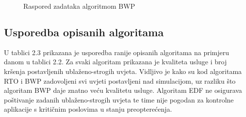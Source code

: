 \documentclass[../zavrsni.tex]{subfiles}
\begin{document}
 \begin{figure}[h!]
    \centering

    \begin{RTGrid}[width=13cm]{3}{24}

    
  
    
  
    

    \end{RTGrid}

    \caption{Raspored zadataka algoritmom BWP}
    \label{fig:ex1}
  \end{figure}

\subsection{Usporedba opisanih algoritama}

U tablici 2.3 prikazana je usporedba ranije opisanih algoritama na primjeru danom u tablici 2.2. Za svaki algoritam prikazana je 
kvaliteta usluge i broj kršenja postavljenih ublaženo-strogih uvjeta. 
Vidljivo je kako su kod algoritama RTO i BWP zadovoljeni svi uvjeti postavljeni nad simulacijom, uz razliku što algoritam BWP daje 
znatno veću kvalitetu usluge. Algoritam EDF ne osigurava poštivanje zadanih ublaženo-strogih uvjeta te time nije pogodan za kontrolne 
aplikacije s kritičnim poslovima u stanju preopterećenja.
\end{document}

